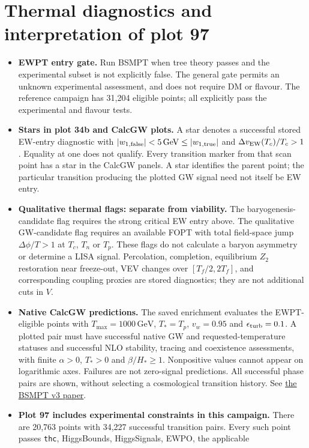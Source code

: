 \documentclass[11pt,a4paper]{article}
\newcommand{\code}[1]{\ifmmode\mbox{\ttfamily\detokenize{#1}}\else\nolinkurl{#1}\fi}
\newcommand{\GeV}{\,\mathrm{GeV}}
\begin{document}
\section{Thermal diagnostics and interpretation of plot 97}
\begin{itemize}
\item \textbf{EWPT entry gate.} Run BSMPT when tree theory passes and
the experimental subset is not explicitly false. The general gate permits
an unknown experimental assessment, and does not require DM or flavour.
The reference campaign has 31,204 eligible points; all explicitly pass
the experimental and flavour tests.
\item \textbf{Stars in plot 34b and CalcGW plots.} A star denotes a
successful stored EW-entry diagnostic with
$|w_{1,\rm false}|<5\GeV\leq|w_{1,\rm true}|$ and
$\Delta v_{\rm EW}(T_c)/T_c>1$. Equality at one does not qualify.
Every transition marker from that scan point has a star in the CalcGW
panels. A star identifies the parent point; the particular transition
producing the plotted GW signal need not itself be EW entry.
\item \textbf{Qualitative thermal flags: separate from viability.}
The baryogenesis-candidate flag requires the strong critical EW entry
above. The qualitative GW-candidate flag requires an available FOPT with
total field-space jump $\Delta\phi/T>1$ at $T_c$, $T_n$ or $T_p$.
These flags do not calculate a baryon asymmetry or determine a LISA signal.
Percolation, completion, equilibrium $Z_2$ restoration near freeze-out,
VEV changes over $[T_f/2,2T_f]$, and corresponding coupling proxies are
stored diagnostics; they are not additional cuts in $V$.
\item \textbf{Native CalcGW predictions.} The saved enrichment evaluates
the EWPT-eligible points with $T_{\max}=1000\GeV$, $T_*=T_p$,
$v_w=0.95$ and $\epsilon_{\rm turb}=0.1$. A plotted pair must have
successful native GW and requested-temperature statuses and successful
NLO stability, tracing and coexistence assessments, with finite
$\alpha>0$, $T_*>0$ and $\beta/H_*\geq1$. Nonpositive values cannot appear
on logarithmic axes. Failures are not zero-signal predictions.
All successful phase pairs are shown, without selecting a cosmological
transition history. See \href{https://arxiv.org/abs/2404.19037}{the BSMPT v3 paper}.
\item \textbf{Plot 97 includes experimental constraints in this campaign.}
There are 20,763 points with 34,227 successful transition pairs. Every such
point passes \code{thc}, HiggsBounds, HiggsSignals, EWPO, the applicable

\end{itemize}
\end{document}
